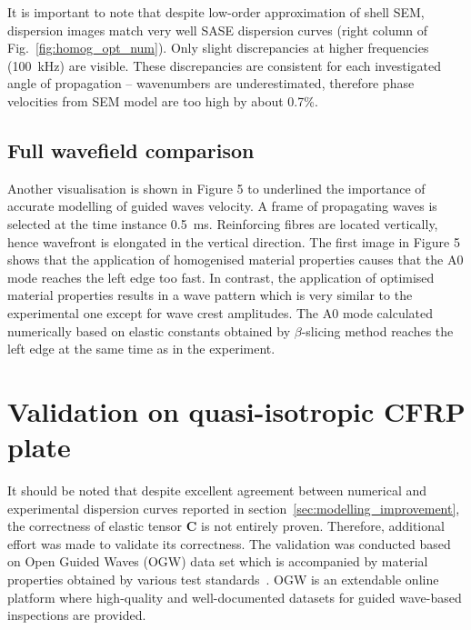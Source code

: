 \documentclass[preprint,12pt]{elsarticle}
\newcommand{\matr}[1]{\mathbf{#1}} %
\begin{document}
It is important to note that despite low-order approximation of shell SEM, dispersion images match very well SASE dispersion curves (right column of Fig.~\ref{fig:homog_opt_num}). 
Only slight discrepancies at higher frequencies (100~kHz) are visible. 
These discrepancies are consistent for each investigated angle of propagation – wavenumbers are underestimated, therefore phase velocities from SEM model are too high by about 0.7\%.
\subsection{Full wavefield comparison}
Another visualisation is shown in Figure 5 to underlined the importance of accurate modelling of guided waves velocity. 
A frame of propagating waves is selected at the time instance 0.5~ms. 
Reinforcing fibres are located vertically, hence wavefront is elongated in the vertical direction.
The first image in Figure 5 shows that the application of homogenised material properties causes that the A0 mode reaches the left edge too fast. 
In contrast, the application of optimised material properties results in a wave pattern which is very similar to the experimental one except for wave crest amplitudes. 
The A0 mode calculated numerically based on elastic constants obtained by $\beta$-slicing method reaches the left edge at the same time as in the experiment.
\section{Validation on quasi-isotropic CFRP plate\label{sec:validation}}
It should be noted that despite excellent agreement between numerical and experimental dispersion curves reported in section~\ref{sec:modelling_improvement}, the correctness of elastic tensor $\matr{C}$ is not entirely proven.
Therefore, additional effort was made to validate its correctness.
The validation was conducted based on Open Guided Waves (OGW) data set which is accompanied by material properties obtained by various test standards~\cite{Moll2019}.
OGW is an extendable online platform where high-quality and well-documented datasets for guided wave-based inspections are provided.
\end{document}
